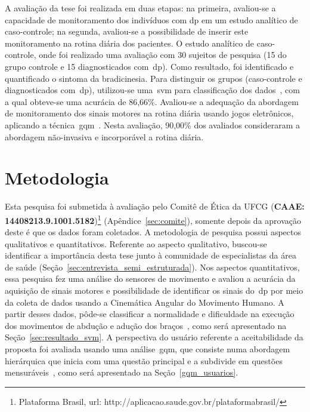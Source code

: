 A avaliação da tese foi realizada em duas etapas: na primeira, avaliou-se a capacidade de monitoramento dos indivíduos com \ac{dp} em um estudo analítico de caso-controle; na segunda, avaliou-se a possibilidade de inserir este monitoramento na rotina diária dos pacientes. O estudo analítico de caso-controle, onde foi realizado uma avaliação com 30 sujeitos de pesquisa (15 do grupo controle e 15 diagnosticados com~\ac{dp}). Como resultado, foi identificado e quantificado o sintoma da bradicinesia. Para distinguir os grupos (caso-controle e diagnosticados com~\ac{dp}), utilizou-se uma~\ac{svm} para classificação dos dados~\cite{datamining2005}, com a qual obteve-se uma acurácia de 86,66\%. Avaliou-se a adequação da abordagem de monitoramento dos sinais motores na rotina diária usando jogos eletrônicos, aplicando a técnica~\ac{gqm}~\cite{van1999goal}. Nesta avaliação, 90,00\% dos avaliados consideraram a abordagem não-invasiva e incorporável a rotina diária. 



\section{Metodologia}\label{section:metodologia}
Esta pesquisa foi submetida à avaliação pelo Comitê de Ética da UFCG (\textbf{CAAE: 14408213.9.1001.5182})\footnote{Plataforma Brasil, url: http://aplicacao.saude.gov.br/plataformabrasil/} (Apêndice~\ref{sec:comite}), somente depois da aprovação deste é que os dados foram coletados. A metodologia de pesquisa possui aspectos qualitativos e quantitativos. Referente ao aspecto qualitativo, buscou-se identificar a importância desta tese junto à comunidade de especialistas da área de saúde (Seção~\ref{sec:entrevista_semi_estruturada}). Nos aspectos quantitativos, essa pesquisa fez uma análise do sensores de movimento e avaliou a acurácia da aquisição de sinais motores e possibilidade de identificar os sinais do~\ac{dp} por meio da coleta de dados usando a Cinemática Angular do Movimento Humano. A partir desses dados, pôde-se classificar a normalidade e dificuldade na execução dos movimentos de abdução e adução dos braços~\cite{mcginnis2013biomechanics}, como será apresentado na Seção~\ref{sec:resultado_svm}. A perspectiva do usuário referente a aceitabilidade da proposta foi avaliada usando uma análise~\ac{gqm}, que consiste numa abordagem hierárquica que inicia com uma questão principal e a subdivide em questões mensuráveis~\cite{saraiva2006}, como será apresentado na Seção~\ref{gqm_usuarios}.

